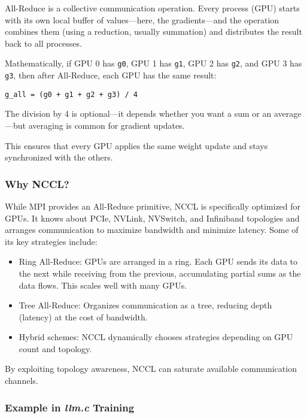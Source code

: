 \documentclass[
  letterpaper,
  DIV=11,
  numbers=noendperiod]{scrreprt}
\providecommand{\tightlist}{%
  \setlength{\itemsep}{0pt}\setlength{\parskip}{0pt}}
\begin{document}
All-Reduce is a collective communication operation. Every process (GPU)
starts with its own local buffer of values---here, the gradients---and
the operation combines them (using a reduction, usually summation) and
distributes the result back to all processes.

Mathematically, if GPU 0 has \texttt{g0}, GPU 1 has \texttt{g1}, GPU 2
has \texttt{g2}, and GPU 3 has \texttt{g3}, then after All-Reduce, each
GPU has the same result:

\begin{verbatim}
g_all = (g0 + g1 + g2 + g3) / 4
\end{verbatim}

The division by 4 is optional---it depends whether you want a sum or an
average---but averaging is common for gradient updates.

This ensures that every GPU applies the same weight update and stays
synchronized with the others.

\subsubsection{Why NCCL?}\label{why-nccl}

While MPI provides an All-Reduce primitive, NCCL is specifically
optimized for GPUs. It knows about PCIe, NVLink, NVSwitch, and
Infiniband topologies and arranges communication to maximize bandwidth
and minimize latency. Some of its key strategies include:

\begin{itemize}
\tightlist
\item
  Ring All-Reduce: GPUs are arranged in a ring. Each GPU sends its data
  to the next while receiving from the previous, accumulating partial
  sums as the data flows. This scales well with many GPUs.
\item
  Tree All-Reduce: Organizes communication as a tree, reducing depth
  (latency) at the cost of bandwidth.
\item
  Hybrid schemes: NCCL dynamically chooses strategies depending on GPU
  count and topology.
\end{itemize}

By exploiting topology awareness, NCCL can saturate available
communication channels.

\subsubsection{\texorpdfstring{Example in \emph{llm.c}
Training}{Example in llm.c Training}}\label{example-in-llm.c-training}
\end{document}
